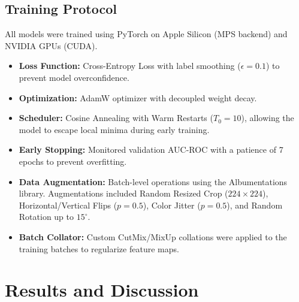 \documentclass[11pt,journal,compsoc]{IEEEtran}
\begin{document}
\subsection{Training Protocol}
All models were trained using PyTorch on Apple Silicon (MPS backend) and NVIDIA GPUs (CUDA). 
\begin{itemize}
    \item \textbf{Loss Function:} Cross-Entropy Loss with label smoothing ($\epsilon=0.1$) to prevent model overconfidence.
    \item \textbf{Optimization:} AdamW optimizer with decoupled weight decay.
    \item \textbf{Scheduler:} Cosine Annealing with Warm Restarts ($T_0=10$), allowing the model to escape local minima during early training.
    \item \textbf{Early Stopping:} Monitored validation AUC-ROC with a patience of 7 epochs to prevent overfitting.
    \item \textbf{Data Augmentation:} Batch-level operations using the Albumentations library. Augmentations included Random Resized Crop ($224 \times 224$), Horizontal/Vertical Flips ($p=0.5$), Color Jitter ($p=0.5$), and Random Rotation up to $15^\circ$.
    \item \textbf{Batch Collator:} Custom CutMix/MixUp collations were applied to the training batches to regularize feature maps.
\end{itemize}

\section{Results and Discussion}
\end{document}
